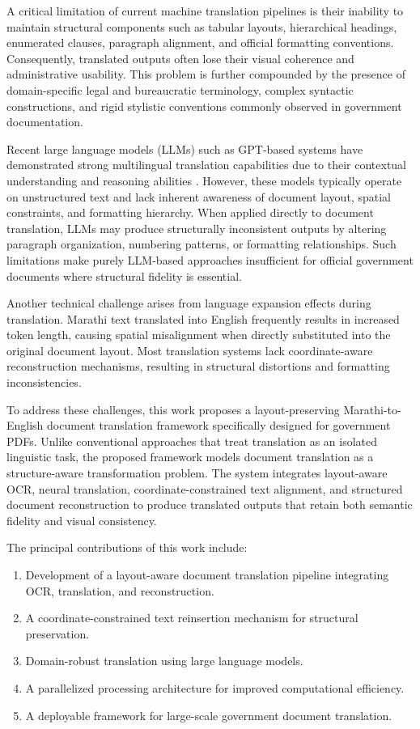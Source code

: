 \documentclass[11pt]{article}
\begin{document}
A critical limitation of current machine translation pipelines is their inability to maintain structural components such as tabular layouts, hierarchical headings, enumerated clauses, paragraph alignment, and official formatting conventions. Consequently, translated outputs often lose their visual coherence and administrative usability. This problem is further compounded by the presence of domain-specific legal and bureaucratic terminology, complex syntactic constructions, and rigid stylistic conventions commonly observed in government documentation.

Recent large language models (LLMs) such as GPT-based systems have demonstrated strong multilingual translation capabilities due to their contextual understanding and reasoning abilities \cite{gala_indictrans2:_2023,fan_beyond_2020,team_no_2022}. However, these models typically operate on unstructured text and lack inherent awareness of document layout, spatial constraints, and formatting hierarchy. When applied directly to document translation, LLMs may produce structurally inconsistent outputs by altering paragraph organization, numbering patterns, or formatting relationships. Such limitations make purely LLM-based approaches insufficient for official government documents where structural fidelity is essential.

Another technical challenge arises from language expansion effects during translation. Marathi text translated into English frequently results in increased token length, causing spatial misalignment when directly substituted into the original document layout. Most translation systems lack coordinate-aware reconstruction mechanisms, resulting in structural distortions and formatting inconsistencies.

To address these challenges, this work proposes a layout-preserving Marathi-to-English document translation framework specifically designed for government PDFs. Unlike conventional approaches that treat translation as an isolated linguistic task, the proposed framework models document translation as a structure-aware transformation problem. The system integrates layout-aware OCR, neural translation, coordinate-constrained text alignment, and structured document reconstruction to produce translated outputs that retain both semantic fidelity and visual consistency.

The principal contributions of this work include:

\begin{enumerate}
\item Development of a layout-aware document translation pipeline integrating OCR, translation, and reconstruction.
\item A coordinate-constrained text reinsertion mechanism for structural preservation.
\item Domain-robust translation using large language models.
\item A parallelized processing architecture for improved computational efficiency.
\item A deployable framework for large-scale government document translation.
\end{enumerate}
\end{document}
